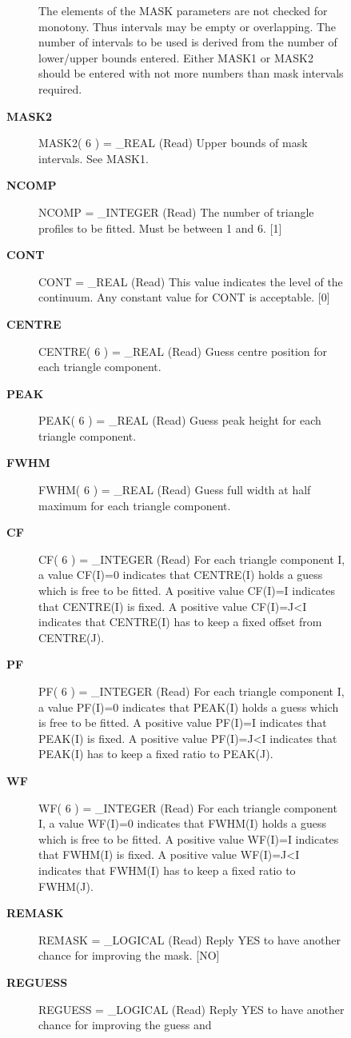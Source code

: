 \begin{description}
\begin{description}
\begin{description}
   The elements of the MASK parameters are not checked for
   monotony. Thus intervals may be empty or overlapping. The
   number of intervals to be used is derived from the number of
   lower/upper bounds entered. Either MASK1 or MASK2 should be
   entered with not more numbers than mask intervals required.
\item [\textbf{MASK2}]
MASK2( 6 ) = \_REAL (Read)
   Upper bounds of mask intervals. See MASK1.
\item [\textbf{NCOMP}]
NCOMP = \_INTEGER (Read)
   The number of triangle profiles to be fitted. Must be between 1
   and 6. [1]
\item [\textbf{CONT}]
CONT = \_REAL (Read)
   This value indicates the level of the continuum. Any constant
   value for CONT is acceptable. [0]
\item [\textbf{CENTRE}]
CENTRE( 6 ) = \_REAL (Read)
   Guess centre position for each triangle component.
\item [\textbf{PEAK}]
PEAK( 6 ) = \_REAL (Read)
   Guess peak height for each triangle component.
\item [\textbf{FWHM}]
FWHM( 6 ) = \_REAL (Read)
   Guess full width at half maximum for each triangle component.
\item [\textbf{CF}]
CF( 6 ) = \_INTEGER (Read)
   For each triangle component I, a value CF(I)=0 indicates that
   CENTRE(I) holds a guess which is free to be fitted.
   A positive value CF(I)=I indicates that CENTRE(I) is fixed.
   A positive value CF(I)=J<I indicates that CENTRE(I) has to
   keep a fixed offset from CENTRE(J).
\item [\textbf{PF}]
PF( 6 ) = \_INTEGER (Read)
   For each triangle component I, a value PF(I)=0 indicates that
   PEAK(I) holds a guess which is free to be fitted.
   A positive value PF(I)=I indicates that PEAK(I) is fixed.
   A positive value PF(I)=J<I indicates that PEAK(I) has to
   keep a fixed ratio to PEAK(J).
\item [\textbf{WF}]
WF( 6 ) = \_INTEGER (Read)
   For each triangle component I, a value WF(I)=0 indicates that
   FWHM(I) holds a guess which is free to be fitted.
   A positive value WF(I)=I indicates that FWHM(I) is fixed.
   A positive value WF(I)=J<I indicates that FWHM(I) has to
   keep a fixed ratio to FWHM(J).
\item [\textbf{REMASK}]
REMASK = \_LOGICAL (Read)
   Reply YES to have another chance for improving the mask.
   [NO]
\item [\textbf{REGUESS}]
REGUESS = \_LOGICAL (Read)
   Reply YES to have another chance for improving the guess and

\end{description}
\end{description}
\end{description}
